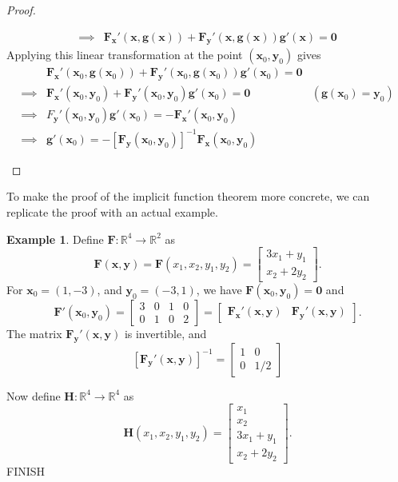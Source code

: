 \documentclass{article}
\newcommand{\R}{\mathbb{R}}
\newcommand{\x}{\mathbf{x}}
\newcommand{\F}{\mathbf{F}}
\newcommand{\y}{\mathbf{y}}
\newcommand{\g}{\mathbf{g}}
\newcommand{\ze}{\mathbf{0}}
\theoremstyle{definition}
\newtheorem{example}{Example}[section]
\begin{document}
\begin{proof}
\begin{enumerate}
\begin{enumerate}
\begin{align*}
					\implies & \F_\x'(\x,\g(\x)) + \F_\y'(\x,\g(\x))\g'(\x) = \ze 
				\end{align*}
				Applying this linear transformation  at the point $ (\x_0,\y_0) $ gives 
				\begin{align*}
					&\F_\x'(\x_0,\g(\x_0)) + \F_\y'(\x_0,\g(\x_0))\g'(\x_0) = \ze \\
					\implies & \F_\x'(\x_0,\y_0) + \F_\y'(\x_0,\y_0)\g'(\x_0) = \ze & (\g(\x_0) = \y_0) \\ 
					\implies & F_\y'(\x_0,\y_0)\g'(\x_0) = -\F_\x'(\x_0,\y_0)  \\
					\implies & \g'(\x_0)=-[\mathbf F_\y(\x_0,\y_0)]^{-1}\mathbf F_\x(\x_0,\y_0)
				\end{align*}
			\end{enumerate}
		\end{enumerate}
	\end{proof}
	To make the proof of the implicit function theorem more concrete, we can replicate the proof with an actual example.
	\begin{example}
		Define $ \F:\R^4\to\R^2 $ as 
		$$ \F(\x,\y) = \F(x_1,x_2,y_1,y_2) = \begin{bmatrix}
			3x_1 + y_1\\
			x_2 + 2y_2
		\end{bmatrix}.$$
		For $ \x_0 = (1,-3) $, and $ \y_0 = (-3,1) $, we have $ \F(\x_0,\y_0)=\ze $ and 
		$$ \F'(\x_0,\y_0) =\left[
		\begin{array}{cc|cc}
			3&0&1&0\\
			0&1&0&2
		\end{array}\right] = \begin{bmatrix}
			\mathbf F_\x'(\x,\y) & \mathbf F_\y'(\x,\y) 
		\end{bmatrix}.$$
		The matrix  $\mathbf F_\y'(\x,\y) $ is invertible, and 
		$$[\mathbf F_\y'(\x,\y)]^{-1}  = \begin{bmatrix}
			1 & 0\\0 &1/2
		\end{bmatrix}$$
		
		Now define $ \mathbf H:\R^4\to\R^4 $ as 
		$$ \mathbf H(x_1,x_2,y_1,y_2) = \begin{bmatrix}
			x_1\\
			x_2\\
			3x_1 + y_1\\
			x_2 + 2y_2
		\end{bmatrix}.$$
	{\color{red}FINISH}
	\end{example}
\end{document}
